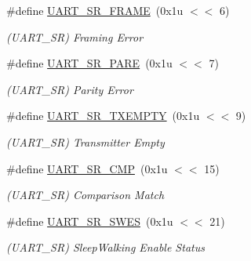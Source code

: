 \begin{DoxyCompactItemize}
\mbox{\label{group__SAMV71__UART_gad41ad9c2fa5c5be16c53b845917b48e0}} 
\#define \mbox{\hyperlink{group__SAMV71__UART_gad41ad9c2fa5c5be16c53b845917b48e0}{U\+A\+R\+T\+\_\+\+S\+R\+\_\+\+F\+R\+A\+ME}}~(0x1u $<$$<$ 6)
\begin{DoxyCompactList}\small\item\em (U\+A\+R\+T\+\_\+\+SR) Framing Error \end{DoxyCompactList}\item 
\mbox{\label{group__SAMV71__UART_ga937c55851deda799bb2f2ee96e6fd81b}} 
\#define \mbox{\hyperlink{group__SAMV71__UART_ga937c55851deda799bb2f2ee96e6fd81b}{U\+A\+R\+T\+\_\+\+S\+R\+\_\+\+P\+A\+RE}}~(0x1u $<$$<$ 7)
\begin{DoxyCompactList}\small\item\em (U\+A\+R\+T\+\_\+\+SR) Parity Error \end{DoxyCompactList}\item 
\mbox{\label{group__SAMV71__UART_gab3c2d147ce2624a3f11c45d2051828af}} 
\#define \mbox{\hyperlink{group__SAMV71__UART_gab3c2d147ce2624a3f11c45d2051828af}{U\+A\+R\+T\+\_\+\+S\+R\+\_\+\+T\+X\+E\+M\+P\+TY}}~(0x1u $<$$<$ 9)
\begin{DoxyCompactList}\small\item\em (U\+A\+R\+T\+\_\+\+SR) Transmitter Empty \end{DoxyCompactList}\item 
\mbox{\label{group__SAMV71__UART_gae60bfce92b111f1320c0543fc83cbb48}} 
\#define \mbox{\hyperlink{group__SAMV71__UART_gae60bfce92b111f1320c0543fc83cbb48}{U\+A\+R\+T\+\_\+\+S\+R\+\_\+\+C\+MP}}~(0x1u $<$$<$ 15)
\begin{DoxyCompactList}\small\item\em (U\+A\+R\+T\+\_\+\+SR) Comparison Match \end{DoxyCompactList}\item 
\mbox{\label{group__SAMV71__UART_gad9b0a1d17d4c4bad1bed6a49621d710c}} 
\#define \mbox{\hyperlink{group__SAMV71__UART_gad9b0a1d17d4c4bad1bed6a49621d710c}{U\+A\+R\+T\+\_\+\+S\+R\+\_\+\+S\+W\+ES}}~(0x1u $<$$<$ 21)
\begin{DoxyCompactList}\small\item\em (U\+A\+R\+T\+\_\+\+SR) Sleep\+Walking Enable Status \end{DoxyCompactList}\item 
$$
\end{DoxyCompactItemize}
